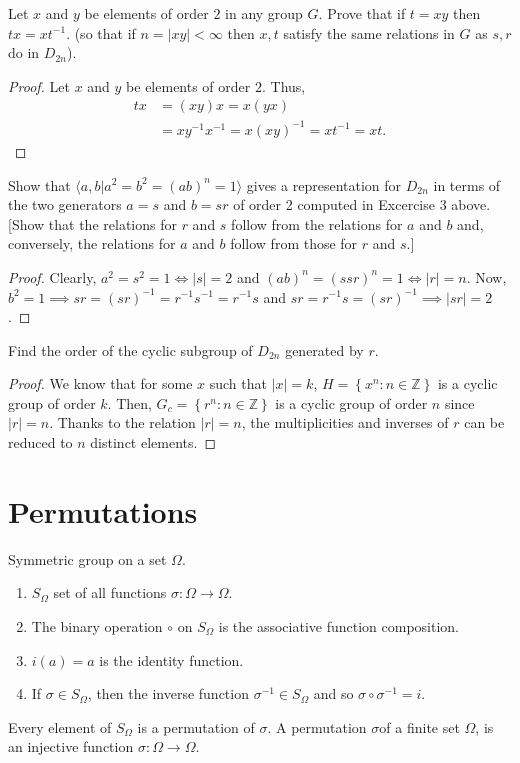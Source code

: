 \documentclass[12pt]{article}
\newcommand{\Z}{\mathbb{Z}}
\newenvironment{problem}[2][Problem]{\begin{trivlist} \item[\hskip \labelsep {\bfseries #1}\hskip \labelsep {\bfseries #2.}]}{\end{trivlist}}
\begin{document}
\begin{problem}{6}
  Let $x$ and $y$ be elements of order $2$ in any group $G$. Prove that if $t=xy$ then $tx=xt^{-1}$. (so that if $n=|xy|<\infty$ then $x,t$ satisfy the same relations in $G$ as $s,r$ do in $D_{2n}$).
\begin{proof}
  Let $x$ and $y$ be elements of order $2$. Thus, 
\begin{align*}
  tx &= (xy)x = x(yx)\\
  &= xy^{-1}x^{-1} = x(xy)^{-1} = xt^{-1} = xt.
\end{align*}
\end{proof}
\end{problem}
\begin{problem}{7}
  Show that $\langle a,b| a^{2} = b^{2} = (ab)^{n} = 1\rangle$ gives a representation for $D_{2n}$ in terms of the two generators $a=s$ and $b=sr$ of order 2 computed in Excercise $3$ above. [Show that the relations for $r$ and $s$ follow from the relations for $a$ and $b$ and, conversely, the relations for $a$ and $b$ follow from those for $r$ and $s$.]
\begin{proof}
  Clearly, $a^{2} = s^{2} = 1 \iff |s|=2$ and $(ab)^{n}=(ssr)^{n}=1\iff |r|=n$. Now, $b^{2}=1\implies sr=(sr)^{-1} = r^{-1}s^{-1} = r^{-1}s$ and $sr = r^{-1}s = (sr)^{-1} \implies |sr|=2$. 
\end{proof}
\end{problem}
\begin{problem}{8}
  Find the order of the cyclic subgroup of $D_{2n}$ generated by $r$. 
\begin{proof}
  We know that for some $x$ such that $|x|=k$, $H=\left\{ x^{n}:n\in\Z \right\}$ is a cyclic group of order $k$. Then, $G_{c} = \left\{ r^{n}:n\in\Z \right\}$ is a cyclic group of order $n$ since $|r|=n$. Thanks to the relation $|r|=n$, the multiplicities and inverses of $r$ can be reduced to $n$ distinct elements.
\end{proof}
\end{problem}
\section{Permutations}
Symmetric group on a set $\Omega$.
\begin{enumerate}
  \item $S_{\Omega}$ set of all functions $\sigma:\Omega\to \Omega$.
  \item The binary operation $\circ$ on $S_{\Omega}$ is the associative function composition.
  \item $i(a)=a$ is the identity function.
  \item If $\sigma\in S_{\Omega}$, then the inverse function $\sigma^{-1}\in S_{\Omega}$ and so $\sigma\circ\sigma^{-1} = i$. 
\end{enumerate}
Every element of $S_{\Omega}$ is a permutation of $\sigma$. A permutation $\sigma$of a finite set $\Omega$, is an injective function $\sigma:\Omega\to \Omega$.\\
\end{document}
